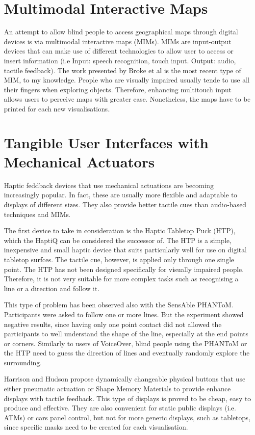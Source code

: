 \section{Multimodal Interactive Maps}
An attempt to allow blind people to access geographical maps through digital devices is via multimodal interactive maps (MIMs). MIMs are input-output devices that can make use of different technologies to allow user to access or insert information (i.e Input: speech recognition, touch input. Output: audio, tactile feedback). The work presented by Broke et al \cite{brock2010usage} is the most recent type of MIM, to my knowledge. People who are visually impaired usually tende to use all their fingers when exploring objects. Therefore, enhancing multitouch input allows users to perceive maps with greater ease. Nonetheless, the maps have to be printed for each new visualisations. 

\section{Tangible User Interfaces with Mechanical Actuators}
Haptic feddback devices that use mechanical actuations are becoming increasingly popular. In fact, these are usually more flexible and adaptable to displays of different sizes. They also provide better tactile cues than audio-based techniques and MIMs.

The first device to take in consideration is the Haptic Tabletop Puck (HTP)\cite{marquardt2009haptic}, which the HaptiQ can be considered the successor of. The HTP is a simple, inexpensive and small haptic device that suits particularly well for use on digital tabletop surfces. The tactile cue, however, is applied only through one single point. The HTP has not been designed specifically for visually impaired people. Therefore, it is not very suitable for more complex tasks such as recognising a line or a direction and follow it. 

This type of problem has been observed also with the SensAble PHANToM\cite{massie1994phantom, yu2001haptic}. Participants were asked to follow one or more lines. But the experiment showed negative results, since having only one point contact did not allowed the participants to well understand the shape of the line, especially at the end points or corners. Similarly to users of VoiceOver, blind people using the PHANToM or the HTP need to guess the direction of lines and eventually randomly explore the surrounding. 

Harrison and Hudson \cite{harrison2009providing} propose dynamically changeable physical buttons that use either pneumatic actuation or Shape Memory Materials to provide enhance displays with tactile feedback. This type of displays is proved to be cheap, easy to produce and effective. They are also convenient for static public displays (i.e. ATMs) or cars panel control, but not for more generic displays, such as tabletops, since specific masks need to be created for each visualisation. 

